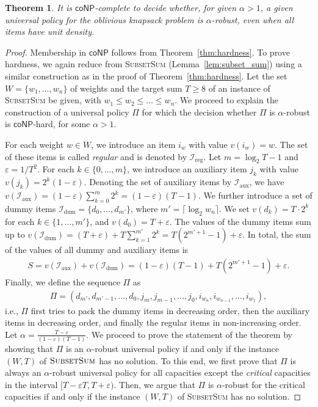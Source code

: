\documentclass[11pt]{article}
\newtheorem{theorem}{Theorem}
\newcommand{\I}{\mathcal{I}}
\newcommand{\classcoNP}{\mathsf{coNP}}
\renewcommand{\epsilon}{\varepsilon}
\begin{document}
\begin{theorem}
\label{thm:hardness_unit} It is $\classcoNP$-complete to decide
whether, for given $\alpha>1$, a given universal policy for the oblivious
knapsack problem is $\alpha$-robust, even when all items have unit
density.\end{theorem}
\begin{proof}
Membership in $\classcoNP$ follows from Theorem~\ref{thm:hardness}.
To prove hardness, we again reduce from \textsc{SubsetSum} (Lemma~\ref{lem:subset_sum})
using a similar construction as in the proof of Theorem~\ref{thm:hardness}.
Let the set $W=\{w_{1},\dots,w_{n}\}$ of weights and the target sum
$T\geq8$ of an instance of \textsc{SubsetSum} be given, with $w_{1}\leq w_{2}\leq\dots\leq w_{n}$.
We proceed to explain the construction of a universal policy $\Pi$
for which the decision whether $\Pi$ is $\alpha$-robust is $\classcoNP$-hard,
for some $\alpha>1$.

For each weight $w\in W$, we introduce an item $i_{w}$ with value
$v(i_{w})=w$. The set of these items is called \emph{regular} and
is denoted by $\I_{\text{{reg}}}$. Let $m=\log_{2}T-1$ and $\epsilon=1/T^{2}$.
For each $k\in\{0,\dots,m\}$, we introduce an auxiliary item $j_{k}$
with value $v(j_{k})=2^{k}(1-\epsilon)$. Denoting the set of auxiliary
items by $\I_{\text{{aux}}}$, we have $v(\I_{\text{{aux}}})=(1-\epsilon)\sum_{k=0}^{m}2^{k}=(1-\epsilon)(T-1)$.
We further introduce a set of dummy items $\I_{\text{{dum}}}=\{d_{0},\dots,d_{m'}\}$,
where $m'=\lceil\log_{2}w_{n}\rceil$. We set $v(d_{k})=T\cdot2^{k}$
for each $k\in\{1,\dots,m'\}$, and $v(d_{0})=T+\varepsilon$. The
values of the dummy items sum up to $v(\I_{\text{{dum}}})=(T+\epsilon)+T\sum_{k=1}^{m'}2^{k}=T(2^{m'+1}-1)+\epsilon$.
In total, the sum of the values of all dummy and auxiliary items is
\begin{align}
S=v(\I_{\text{{aux}}})+v(\I_{\text{{dum}}})=(1-\epsilon)(T-1)+T(2^{m'+1}-1)+\epsilon.\label{eq:sum-1}
\end{align}
Finally, we define the sequence $\Pi$ as 
\begin{align*}
\Pi=(d_{m'},d_{m'-1},\dots,d_{0},j_{m},j_{m-1},\dots,j_{0},i_{w_{n}},i_{w_{n-1}},\dots,i_{w_{1}}),
\end{align*}
i.e., $\Pi$ first tries to pack the dummy items in decreasing order,
then the auxiliary items in decreasing order, and finally the regular
items in non-increasing order. Let $\alpha=\frac{T-\epsilon}{(1-\epsilon)(T-1)}$.
We proceed to prove the statement of the theorem by showing that $\Pi$
is an $\alpha$-robust universal policy if and only if the instance
$(W,T)$ of $\textsc{SubsetSum}$ has no solution. To this end, we
first prove that $\Pi$ is always an $\alpha$-robust universal policy
for all capacities except the \emph{critical} capacities in the interval
$\big[T-\epsilon T,T+\epsilon\big)$. Then, we argue that $\Pi$ is
$\alpha$-robust for the critical capacities if and only if the instance
$(W,T)$ of \textsc{SubsetSum} has no solution.


\end{proof}
\end{document}
